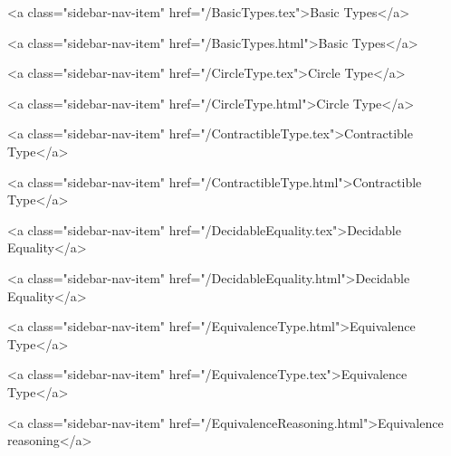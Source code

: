           <a class="sidebar-nav-item" href="/BasicTypes.tex">Basic Types</a>
        
      
    
      
        
          <a class="sidebar-nav-item" href="/BasicTypes.html">Basic Types</a>
        
      
    
      
        
          <a class="sidebar-nav-item" href="/CircleType.tex">Circle Type</a>
        
      
    
      
        
          <a class="sidebar-nav-item" href="/CircleType.html">Circle Type</a>
        
      
    
      
        
          <a class="sidebar-nav-item" href="/ContractibleType.tex">Contractible Type</a>
        
      
    
      
        
          <a class="sidebar-nav-item" href="/ContractibleType.html">Contractible Type</a>
        
      
    
      
        
          <a class="sidebar-nav-item" href="/DecidableEquality.tex">Decidable Equality</a>
        
      
    
      
        
          <a class="sidebar-nav-item" href="/DecidableEquality.html">Decidable Equality</a>
        
      
    
      
        
          <a class="sidebar-nav-item" href="/EquivalenceType.html">Equivalence Type</a>
        
      
    
      
        
          <a class="sidebar-nav-item" href="/EquivalenceType.tex">Equivalence Type</a>
        
      
    
      
        
          <a class="sidebar-nav-item" href="/EquivalenceReasoning.html">Equivalence reasoning</a>
        
      
    

